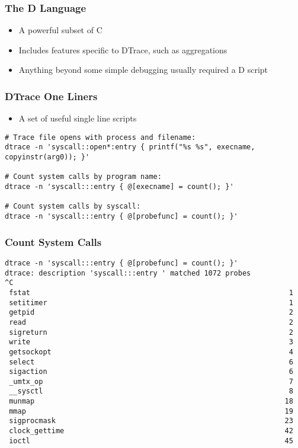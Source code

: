 \documentclass[pdftex]{beamer}
\begin{document}
\begin{frame}
  \frametitle{The D Language}
  \begin{itemize}
  \item A powerful subset of C
  \item Includes features specific to DTrace, such as aggregations
  \item Anything beyond some simple debugging usually required a D
    script
  \end{itemize}
\end{frame}

\begin{frame}[fragile]
  \frametitle{DTrace One Liners}
  \begin{itemize}
  \item A set of useful single line scripts
  \end{itemize}
\begin{lstlisting}
# Trace file opens with process and filename:
dtrace -n 'syscall::open*:entry { printf("%s %s", execname, copyinstr(arg0)); }'

# Count system calls by program name:
dtrace -n 'syscall:::entry { @[execname] = count(); }'

# Count system calls by syscall:
dtrace -n 'syscall:::entry { @[probefunc] = count(); }'
\end{lstlisting}
\end{frame}

\begin{frame}[fragile]
  \frametitle{Count System Calls}
\begin{lstlisting}
dtrace -n 'syscall:::entry { @[probefunc] = count(); }'
dtrace: description 'syscall:::entry ' matched 1072 probes
^C
 fstat                                                             1
 setitimer                                                         1
 getpid                                                            2
 read                                                              2
 sigreturn                                                         2
 write                                                             3
 getsockopt                                                        4
 select                                                            6
 sigaction                                                         6
 _umtx_op                                                          7
 __sysctl                                                          8
 munmap                                                           18
 mmap                                                             19
 sigprocmask                                                      23
 clock_gettime                                                    42
 ioctl                                                            45
\end{lstlisting}
\end{frame}
\end{document}
